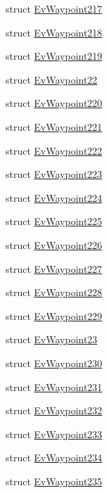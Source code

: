 \begin{DoxyCompactItemize}
\item 
struct \hyperlink{structcl__move__base__z_1_1EvWaypoint217}{Ev\+Waypoint217}
\item 
struct \hyperlink{structcl__move__base__z_1_1EvWaypoint218}{Ev\+Waypoint218}
\item 
struct \hyperlink{structcl__move__base__z_1_1EvWaypoint219}{Ev\+Waypoint219}
\item 
struct \hyperlink{structcl__move__base__z_1_1EvWaypoint22}{Ev\+Waypoint22}
\item 
struct \hyperlink{structcl__move__base__z_1_1EvWaypoint220}{Ev\+Waypoint220}
\item 
struct \hyperlink{structcl__move__base__z_1_1EvWaypoint221}{Ev\+Waypoint221}
\item 
struct \hyperlink{structcl__move__base__z_1_1EvWaypoint222}{Ev\+Waypoint222}
\item 
struct \hyperlink{structcl__move__base__z_1_1EvWaypoint223}{Ev\+Waypoint223}
\item 
struct \hyperlink{structcl__move__base__z_1_1EvWaypoint224}{Ev\+Waypoint224}
\item 
struct \hyperlink{structcl__move__base__z_1_1EvWaypoint225}{Ev\+Waypoint225}
\item 
struct \hyperlink{structcl__move__base__z_1_1EvWaypoint226}{Ev\+Waypoint226}
\item 
struct \hyperlink{structcl__move__base__z_1_1EvWaypoint227}{Ev\+Waypoint227}
\item 
struct \hyperlink{structcl__move__base__z_1_1EvWaypoint228}{Ev\+Waypoint228}
\item 
struct \hyperlink{structcl__move__base__z_1_1EvWaypoint229}{Ev\+Waypoint229}
\item 
struct \hyperlink{structcl__move__base__z_1_1EvWaypoint23}{Ev\+Waypoint23}
\item 
struct \hyperlink{structcl__move__base__z_1_1EvWaypoint230}{Ev\+Waypoint230}
\item 
struct \hyperlink{structcl__move__base__z_1_1EvWaypoint231}{Ev\+Waypoint231}
\item 
struct \hyperlink{structcl__move__base__z_1_1EvWaypoint232}{Ev\+Waypoint232}
\item 
struct \hyperlink{structcl__move__base__z_1_1EvWaypoint233}{Ev\+Waypoint233}
\item 
struct \hyperlink{structcl__move__base__z_1_1EvWaypoint234}{Ev\+Waypoint234}
\item 
struct \hyperlink{structcl__move__base__z_1_1EvWaypoint235}{Ev\+Waypoint235}

\end{DoxyCompactItemize}
